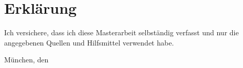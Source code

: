 \chapter{Erklärung}
Ich versichere, dass ich diese Masterarbeit selbständig verfasst und nur die angegebenen Quellen und Hilfsmittel verwendet habe.

\vspace{4\baselineskip}

\makeatletter
München, den \@date
\makeatother
